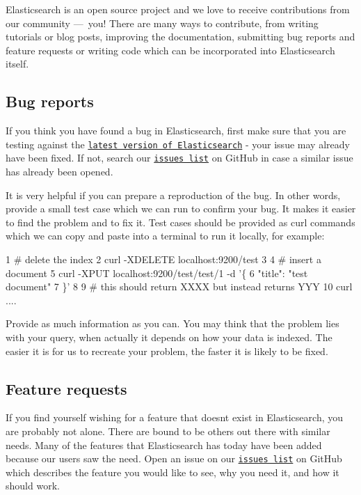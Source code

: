 Elasticsearch is an open source project and we love to receive contributions from our community — you! There are many ways to contribute, from writing tutorials or blog posts, improving the documentation, submitting bug reports and feature requests or writing code which can be incorporated into Elasticsearch itself.

\subsection*{Bug reports }

If you think you have found a bug in Elasticsearch, first make sure that you are testing against the \href{https://www.elastic.co/downloads/elasticsearch}{\tt latest version of Elasticsearch} -\/ your issue may already have been fixed. If not, search our \href{https://github.com/elastic/elasticsearch/issues}{\tt issues list} on Git\+Hub in case a similar issue has already been opened.

It is very helpful if you can prepare a reproduction of the bug. In other words, provide a small test case which we can run to confirm your bug. It makes it easier to find the problem and to fix it. Test cases should be provided as {\ttfamily curl} commands which we can copy and paste into a terminal to run it locally, for example\+:


\begin{DoxyCode}
1 # delete the index
2 curl -XDELETE localhost:9200/test
3 
4 # insert a document
5 curl -XPUT localhost:9200/test/test/1 -d '\{
6  "title": "test document"
7 \}'
8 
9 # this should return XXXX but instead returns YYY
10 curl ....
\end{DoxyCode}


Provide as much information as you can. You may think that the problem lies with your query, when actually it depends on how your data is indexed. The easier it is for us to recreate your problem, the faster it is likely to be fixed.

\subsection*{Feature requests }

If you find yourself wishing for a feature that doesn\textquotesingle{}t exist in Elasticsearch, you are probably not alone. There are bound to be others out there with similar needs. Many of the features that Elasticsearch has today have been added because our users saw the need. Open an issue on our \href{https://github.com/elastic/elasticsearch/issues}{\tt issues list} on Git\+Hub which describes the feature you would like to see, why you need it, and how it should work.


